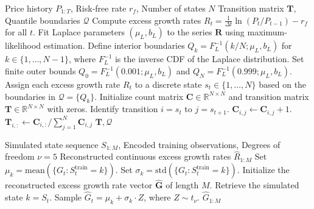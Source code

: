 \clearpage

\begin{algorithm}[tp]
\caption{Empirical hidden Markov model construction via Laplace partitioning}
\label{alg:build}
\small
\begin{algorithmic}[1]
\REQUIRE Price history $P_{1:T}$, Risk-free rate $r_f$, Number of states $N$
\ENSURE Transition matrix $\mathbf{T}$, Quantile boundaries $\mathcal{Q}$
\STATE Compute excess growth rates $R_t = \frac{1}{\Delta t} \ln(P_t / P_{t-1}) - r_f$ for all $t$.
\STATE Fit Laplace parameters $(\mu_L, b_L)$ to the series $\mathbf{R}$ using maximum-likelihood estimation.
\STATE Define interior boundaries $Q_k = F_L^{-1}(k/N; \mu_L, b_L)$ for $k \in \{1, \dots, N-1\}$, where $F_L^{-1}$ is the inverse CDF of the Laplace distribution.
\STATE Set finite outer bounds $Q_0 = F_L^{-1}(0.001; \mu_L, b_L)$ and $Q_N = F_L^{-1}(0.999; \mu_L, b_L)$.
\STATE Assign each excess growth rate $R_t$ to a discrete state $s_t \in \{1, \dots, N\}$ based on the boundaries in $\mathcal{Q} = \{Q_k\}$.
\STATE Initialize count matrix $\mathbf{C} \in \mathbb{R}^{N \times N}$ and transition matrix $\mathbf{T} \in \mathbb{R}^{N \times N}$ with zeros.
    \STATE Identify transition $i = s_t$ to $j = s_{t+1}$.
\STATE $\mathbf{C}_{i,j} \leftarrow \mathbf{C}_{i,j} + 1$.
\ENDFOR
{}
    \STATE $\mathbf{T}_{i,:} \leftarrow \mathbf{C}_{i,:} / \sum_{j=1}^{N} \mathbf{C}_{i,j}$ 
\ENDFOR
\RETURN $\mathbf{T}, \mathcal{Q}$
\end{algorithmic}
\end{algorithm}

\clearpage

\begin{algorithm}[tp]
\caption{State decoding and continuous excess growth rate reconstruction}
\label{alg:decode}
\small
\begin{algorithmic}[1]
\REQUIRE Simulated state sequence $S_{1:M}$, Encoded training observations, Degrees of freedom $\nu=5$
\ENSURE Reconstructed continuous excess growth rates $\hat{R}_{1:M}$
    \STATE Set $\mu_k = \text{mean}(\{G_t : S_t^{\text{train}} = k\})$.
    \STATE Set $\sigma_k = \text{std}(\{G_t : S_t^{\text{train}} = k\})$.
\ENDFOR
\STATE Initialize the reconstructed excess growth rate vector $\mathbf{\hat{G}}$ of length $M$.
    \STATE Retrieve the simulated state $k = S_t$.
\STATE Sample $\hat{G}_t = \mu_k + \sigma_k \cdot Z$, where $Z \sim t_\nu$.
\ENDFOR
\RETURN $\hat{G}_{1:M}$
\end{algorithmic}
\end{algorithm}

